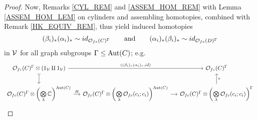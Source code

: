 \documentclass[a4paper,10pt
,draft
]{article}%
\renewcommand{\1}{\eta}%
\begin{document}
\begin{proof}
      Now, Remarks \ref{CYL_REM} and \ref{ASSEM_HOM_REM} with Lemma \ref{ASSEM_HOM_LEM} on cylinders and assembling homotopies,
      combined with Remark \ref{HK_EQUIV_REM}, 
      thus yield induced homotopies
      \begin{equation}
            (\beta_i)_{\**} (\alpha_i)_{\**} \sim id_{\O_{f c}(C)^\Gamma}
            \qquad
            \textrm{and}
            \qquad
            (\alpha_i)_{\**} (\beta_i)_{\**} \sim id_{\O_{f c}(D)^\Gamma}
      \end{equation}
      in $\mathcal V$ for all graph subgroups $\Gamma \leq \operatorname{Aut}(C)$; e.g.
      \begin{equation}
            \begin{tikzcd}[column sep = small]
                  \O_{f c}(C)^\Gamma \otimes (1_\V \amalg 1_\V) \arrow[d, tail] \arrow[rr, "{((\beta_i)_{\**}(\alpha_i)_{\**}, id)}"]
                  &&
                  \O_{f c}(C)^\Gamma
                  \\                  
                  \O_{f c}(C)^\Gamma \otimes \left(\bigotimes\limits_\lambda \mathbb C\right)^{\Aut(C)}
                  \arrow[r, "H"]
                  &
                  \O_{f c}(C)^\Gamma \otimes \left(\bigotimes\limits_\lambda \O_{f c}(c_i;c_i)\right)^{\Aut(C)} \arrow[r]
                  &
                  \O_{f c}(C)^\Gamma \otimes \left(\bigotimes\limits_\lambda \O_{f c}(c_i;c_i)\right)^{\Gamma} \arrow[u, "\circ"']
            \end{tikzcd}
      \end{equation}


\end{proof}
\end{document}

